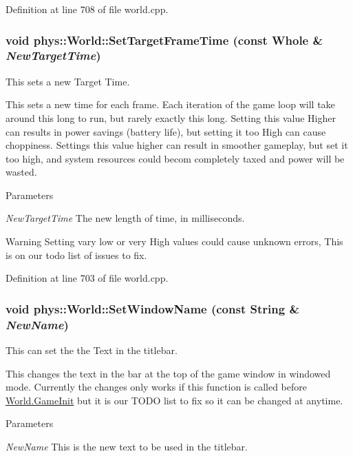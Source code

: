 Definition at line 708 of file world.cpp.

\hypertarget{classphys_1_1World_ad95b5a5ad73e0a05826b5bd834876333}{
\subsubsection[{SetTargetFrameTime}]{\setlength{\rightskip}{0pt plus 5cm}void phys::World::SetTargetFrameTime (const {\bf Whole} \& {\em NewTargetTime})}}
\label{da/ddf/classphys_1_1World_ad95b5a5ad73e0a05826b5bd834876333}


This sets a new Target Time. 

This sets a new time for each frame. Each iteration of the game loop will take around this long to run, but rarely exactly this long. Setting this value Higher can results in power savings (battery life), but setting it too High can cause choppiness. Settings this value higher can result in smoother gameplay, but set it too high, and system resources could becom completely taxed and power will be wasted. 
\begin{DoxyParams}{Parameters}
\item[{\em NewTargetTime}]The new length of time, in milliseconds. \end{DoxyParams}
\begin{DoxyWarning}{Warning}
Setting vary low or very High values could cause unknown errors, This is on our todo list of issues to fix. 
\end{DoxyWarning}


Definition at line 703 of file world.cpp.

\hypertarget{classphys_1_1World_acd0dff342c08fe3008226488b7c53d97}{
\subsubsection[{SetWindowName}]{\setlength{\rightskip}{0pt plus 5cm}void phys::World::SetWindowName (const {\bf String} \& {\em NewName})}}
\label{da/ddf/classphys_1_1World_acd0dff342c08fe3008226488b7c53d97}


This can set the the Text in the titlebar. 

This changes the text in the bar at the top of the game window in windowed mode. Currently the changes only works if this function is called before \hyperlink{classphys_1_1World_a21cc36be08a61f40619584d4c438936b}{World.GameInit} but it is our TODO list to fix so it can be changed at anytime. 
\begin{DoxyParams}{Parameters}
\item[{\em NewName}]This is the new text to be used in the titlebar. \end{DoxyParams}


